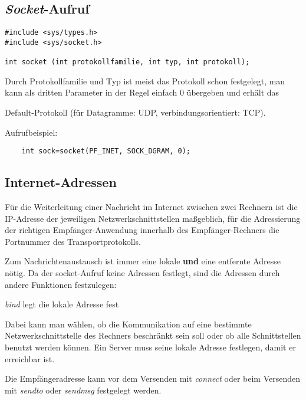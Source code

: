 \documentclass[12pt,utf8]{article}
\begin{document}
\subsection*{{\em Socket\/}-Aufruf}

\begin{verbatim}
#include <sys/types.h>
#include <sys/socket.h>

int socket (int protokollfamilie, int typ, int protokoll);
\end{verbatim}



Durch Protokollfamilie und Typ ist meist das Protokoll schon festgelegt, man
kann als dritten Parameter in der Regel einfach 0 übergeben und erhält das

Default-Protokoll (für Datagramme: UDP, verbindungsorientiert: TCP).


\vspace*{2em}

Aufrufbeispiel:
\begin{verbatim}
    int sock=socket(PF_INET, SOCK_DGRAM, 0);
\end{verbatim}



\subsection*{Internet-Adressen}

Für die Weiterleitung einer Nachricht im Internet zwischen zwei Rechnern
ist die IP-Adresse der jeweiligen Netzwerkschnittstellen maßgeblich, 
für die Adressierung der richtigen
Empfänger-Anwendung innerhalb des Empfänger-Rechners die
Portnummer des Transportprotokolls.

Zum Nachrichtenaustausch ist immer eine lokale {\bf und} eine entfernte
Adresse nötig. Da der socket-Aufruf keine Adressen festlegt, sind die Adressen
durch andere Funktionen festzulegen:
\begin{titemize}
\item {\em bind\/} legt die lokale Adresse fest

Dabei kann man wählen, ob die Kommunikation auf eine bestimmte Netzwerkschnittstelle
des Rechners beschränkt sein soll oder ob alle Schnittstellen benutzt werden
können. Ein Server muss seine lokale Adresse festlegen, damit er
erreichbar ist. 
\item Die Empfängeradresse kann vor dem Versenden mit {\em connect\/} oder
  beim Versenden mit {\em sendto\/}
  oder {\em sendmsg\/} festgelegt werden.
\end{titemize}
\end{document}
